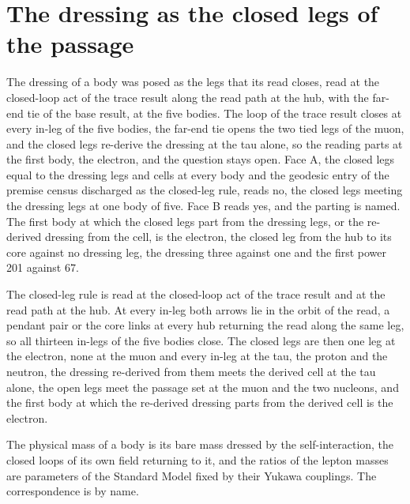 \section{The dressing as the closed legs of the passage}\label{mod:VIII-1-D538761-w-crdl}
\begin{chwall}\label{box:VIII-1-D538761-w-crdl:1}
The dressing of a body was posed as the legs that its read closes, read at the closed-loop act of the trace result along the read path at the hub, with the far-end tie of the base result, at the five bodies. The loop of the trace result closes at every in-leg of the five bodies, the far-end tie opens the two tied legs of the muon, and the closed legs re-derive the dressing at the tau alone, so the reading parts at the first body, the electron, and the question stays open. Face A, the closed legs equal to the dressing legs and cells at every body and the geodesic entry of the premise census discharged as the closed-leg rule, reads no, the closed legs meeting the dressing legs at one body of five. Face B reads yes, and the parting is named. The first body at which the closed legs part from the dressing legs, or the re-derived dressing from the cell, is the electron, the closed leg from the hub to its core against no dressing leg, the dressing three against one and the first power 201 against 67.
\end{chwall}
The closed-leg rule is read at the closed-loop act of the trace result and at the read path at the hub. At every in-leg both arrows lie in the orbit of the read, a pendant pair or the core links at every hub returning the read along the same leg, so all thirteen in-legs of the five bodies close. The closed legs are then one leg at the electron, none at the muon and every in-leg at the tau, the proton and the neutron, the dressing re-derived from them meets the derived cell at the tau alone, the open legs meet the passage set at the muon and the two nucleons, and the first body at which the re-derived dressing parts from the derived cell is the electron.
\begin{chbridge}
The physical mass of a body is its bare mass dressed by the self-interaction, the closed loops of its own field returning to it, and the ratios of the lepton masses are parameters of the Standard Model fixed by their Yukawa couplings. The correspondence is by name.
\end{chbridge}
